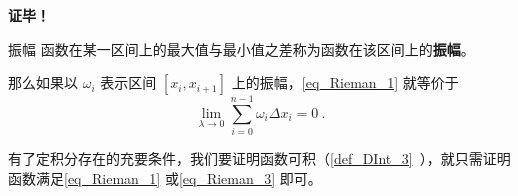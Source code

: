 \textbf{证毕！}

\begin{definition}{振幅}\label{def_Rieman_1}
函数在某一区间上的最大值与最小值之差称为函数在该区间上的\textbf{振幅}。
\end{definition}
那么如果以 $\omega_i$ 表示区间 $[x_i,x_{i+1}]$ 上的振幅，\autoref{eq_Rieman_1} 就等价于
\begin{equation}\label{eq_Rieman_3}
\lim_{\lambda\rightarrow0}\sum_{i=0}^{n-1}\omega_i\Delta x_i=0~.
\end{equation}

有了定积分存在的充要条件，我们要证明函数可积（\autoref{def_DInt_3}~），就只需证明函数满足\autoref{eq_Rieman_1} 或\autoref{eq_Rieman_3} 即可。





